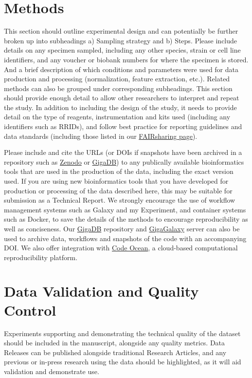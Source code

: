\documentclass[a4paper,num-refs,gigabyte]{oup-contemporary}
\begin{document}
\section{Methods}

This section should outline experimental design and can potentially be further broken up into subheadings a) Sampling strategy and b) Steps. Please include details on any specimen sampled, including any other species, strain or cell line identifiers, and any voucher or biobank numbers for where the specimen is stored. And a brief description of which conditions and parameters were used for data production and processing (normalization, feature extraction, etc.). Related methods can also be grouped under corresponding subheadings. This section should provide enough detail to allow other researchers to interpret and repeat the study. In addition to including the design of the study, it needs to provide detail on the type of reagents, instrumentation and kits used (including any identifiers such as RRIDs), and follow best practice for reporting guidelines and data standards (including those listed in our \href{http://dx.doi.org/10.25504/FAIRsharing.prdtva}{FAIRsharing page}).

Please include and cite the URLs (or DOIs if snapshots have been archived in a repository such as \href{http://gigadb.org/site/term}{Zenodo} or \href{http://gigadb.org/}{GigaDB}) to any publically available bioinformatics tools that are used in the production of the data, including the exact version used. If you are using new bioinformatics tools that you have developed for production or processing of the data described here, this may be suitable for submission as a Technical Report. We strongly encourage the use of workflow management systems such as Galaxy and my Experiment, and container systems such as Docker, to save the details of the methods to encourage reproducibility as well as conciseness. Our \href{http://gigadb.org}{GigaDB} repository and \href{http://gigagalaxy.net}{GigaGalaxy} server can also be used to archive data, workflows and snapshots of the code with an accompanying DOI. We also offer integration with \href{http://gigadb.org/site/term}{Code Ocean}, a cloud-based computational reproducibility platform.

\section{Data Validation and Quality Control}

Experiments supporting and demonstrating the technical quality of the dataset should be included in the manuscript, alongside any quality metrics. Data Releases can be published alongside traditional Research Articles, and any previous or in-press research using the data should be highlighted, as it will aid validation and demonstrate use.
\end{document}
